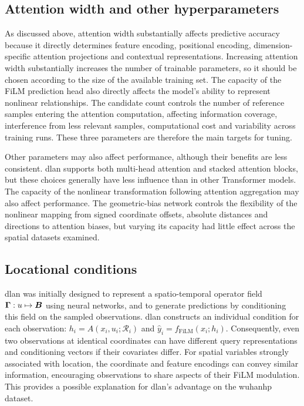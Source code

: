 \documentclass[]{interact}
\newcommand{\DLAN}{\gls{dlan}\xspace}
\newcommand{\GAgg}{GeoAggregator\xspace}
\newcommand{\WuhanHP}{\gls{wuhanhp}\xspace}
\begin{document}
\subsection{Attention width and other hyperparameters}

As discussed above, attention width substantially affects predictive accuracy because it directly determines feature encoding, positional encoding, dimension-specific attention projections and contextual representations.
Increasing attention width substantially increases the number of trainable parameters, so it should be chosen according to the size of the available training set.
The capacity of the FiLM prediction head also directly affects the model's ability to represent nonlinear relationships.
The candidate count controls the number of reference samples entering the attention computation,
affecting information coverage, interference from less relevant samples, computational cost and variability across training runs.
These three parameters are therefore the main targets for tuning.

Other parameters may also affect performance, although their benefits are less consistent.
\DLAN supports both multi-head attention and stacked attention blocks,
but these choices generally have less influence than in other Transformer models.
The capacity of the nonlinear transformation following attention aggregation may also affect performance.
The geometric-bias network controls the flexibility of the nonlinear mapping from signed coordinate offsets, absolute distances and directions to attention biases,
but varying its capacity had little effect across the spatial datasets examined.

\subsection{Locational conditions}\label{sec:multilevel}

\DLAN was initially designed to represent a spatio-temporal operator field $\bm{\Gamma}:u\mapsto\bm{B}$ using neural networks,
and to generate predictions by conditioning this field on the sampled observations.
\DLAN constructs an individual condition for each observation:
$h_i=A(x_i,u_i;\mathcal R_i)$ and $\widehat y_i=f_{\mathrm{FiLM}}(x_i;h_i)$.
Consequently, even two observations at identical coordinates can have different query representations and conditioning vectors if their covariates differ.
For spatial variables strongly associated with location,
the coordinate and feature encodings can convey similar information,
encouraging observations to share aspects of their FiLM modulation.
This provides a possible explanation for \DLAN's advantage on the \WuhanHP dataset.
\end{document}
